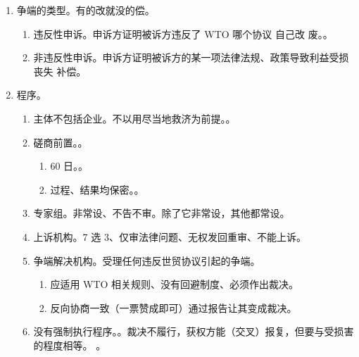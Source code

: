 \begin{enumerate}
        \begin{enumerate}
          \item 是否开放国际服务市场取决于承诺。。
          \item 如果开放服务市场，必须满足最惠国待遇原则，但不要求完全的国民待遇。
          \item 不要求开放到同一水平。。
        \end{enumerate}
  \item 争端的类型。有的改就没的偿。
        \begin{enumerate}
          \item 违反性申诉。申诉方证明被诉方违反了 WTO 哪个协议 \yjt 自己改 \hz 废。。
          \item 非违反性申诉。申诉方证明被诉方的某一项法律法规、政策导致利益受损 \hz 丧失 \yjt 补偿。
        \end{enumerate}
  \item 程序。
        \begin{enumerate}
          \item 主体不包括企业。不以用尽当地救济为前提。。
          \item 磋商前置。。
                \begin{enumerate}
                  \item 60 日。。
                  \item 过程、结果均保密。。
                \end{enumerate}
          \item 专家组。非常设、不告不审。除了它非常设，其他都常设。
          \item 上诉机构。7 选 3、仅审法律问题、无权发回重审、不能上诉。
          \item 争端解决机构。受理任何违反世贸协议引起的争端。
                \begin{enumerate}
                  \item 应适用 WTO 相关规则、没有回避制度、必须作出裁决。
                  \item 反向协商一致（一票赞成即可）通过报告让其变成裁决。
                \end{enumerate}
          \item 没有强制执行程序。。裁决不履行，获权方能（交叉）报复，但要与受损害的程度相等。
                。
        \end{enumerate}
\end{enumerate}
